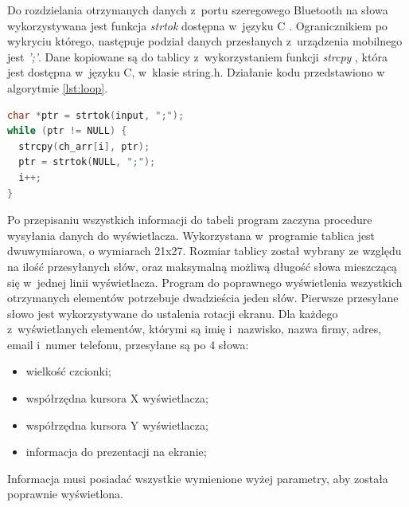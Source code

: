\documentclass[a4paper,12pt, twoside]{article}
\begin{document}
    	Do rozdzielania otrzymanych danych z~portu szeregowego Bluetooth na słowa wykorzystywana jest funkcja \textit{strtok} dostępna w~języku C \cite{strtok}. \label{petladekod}Ogranicznikiem po wykryciu którego, następuje podział danych przesłanych z~urządzenia mobilnego jest \textit{';'}. Dane kopiowane są do tablicy z~wykorzystaniem funkcji \textit{strcpy} \cite{strcpy}, która jest dostępna w~języku C, w~klasie string.h. Działanie kodu przedstawiono w algorytmie \ref{lst:loop}.
    \begin{lstlisting}[language=C++, label={lst:petlaprzepisujaca}, caption=Działanie pętli przepisującej otrzymane dane do tablicy, label={lst:loop}]
char *ptr = strtok(input, ";");
while (ptr != NULL) {
  strcpy(ch_arr[i], ptr);
  ptr = strtok(NULL, ";");
  i++;
}\end{lstlisting}
    
        Po przepisaniu wszystkich informacji do tabeli program zaczyna procedure wysyłania danych do wyświetlacza. Wykorzystana w~programie tablica jest dwuwymiarowa, o wymiarach 21x27. Rozmiar tablicy został wybrany ze względu na ilość przesyłanych słów,  oraz maksymalną możliwą długość słowa mieszczącą się w~jednej linii wyświetlacza. Program do poprawnego wyświetlenia wszystkich otrzymanych elementów potrzebuje dwadzieścia jeden słów. Pierwsze przesyłane słowo jest wykorzystywane do ustalenia rotacji ekranu. Dla każdego z~wyświetlanych elementów, którymi są imię i~nazwisko, nazwa firmy, adres, email i~numer telefonu, przesyłane są po 4 słowa:
        \begin{itemize}
            \item wielkość czcionki;
            \item współrzędna kursora X wyświetlacza;
            \item współrzędna kursora Y wyświetlacza;
            \item informacja do prezentacji na ekranie;
        \end{itemize}
    
    	Informacja musi posiadać wszystkie wymienione wyżej parametry, aby została poprawnie wyświetlona.
    	
\end{document}
